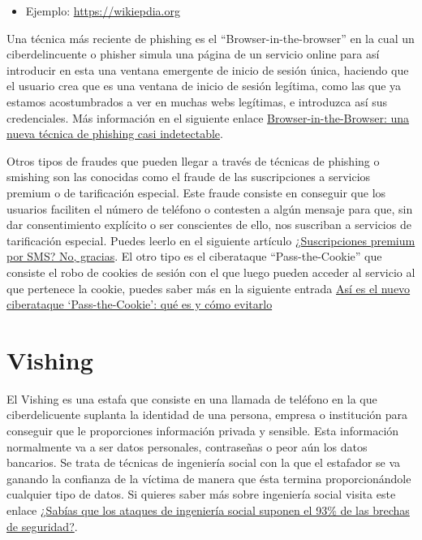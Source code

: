 \documentclass[
  a4paper,
  openany]{book}
\providecommand{\tightlist}{%
  \setlength{\itemsep}{0pt}\setlength{\parskip}{0pt}}
\begin{document}
\begin{itemize}
\tightlist
\item
  Ejemplo: \url{https://wikiepdia.org}
\end{itemize}

Una técnica más reciente de phishing es el ``Browser-in-the-browser'' en la cual un ciberdelincuente o phisher simula una página de un servicio online para así introducir en esta una ventana emergente de inicio de sesión única, haciendo que el usuario crea que es una ventana de inicio de sesión legítima, como las que ya estamos acostumbrados a ver en muchas webs legítimas, e introduzca así sus credenciales. Más información en el siguiente enlace \href{https://www.incibe.es/ciudadania/blog/browser-browser-una-nueva-tecnica-de-phishing-casi-indetectable}{Browser-in-the-Browser: una nueva técnica de phishing casi indetectable}.

Otros tipos de fraudes que pueden llegar a través de técnicas de phishing o smishing son las conocidas como el fraude de las suscripciones a servicios premium o de tarificación especial. Este fraude consiste en conseguir que los usuarios faciliten el número de teléfono o contesten a algún mensaje para que, sin dar consentimiento explícito o ser conscientes de ello, nos suscriban a servicios de tarificación especial. Puedes leerlo en el siguiente artículo \href{https://www.incibe.es/ciudadania/blog/suscripciones-premium-por-sms-no-gracias}{¿Suscripciones premium por SMS? No, gracias}. El otro tipo es el ciberataque ``Pass-the-Cookie'' que consiste el robo de cookies de sesión con el que luego pueden acceder al servicio al que pertenece la cookie, puedes saber más en la siguiente entrada \href{https://www.20minutos.es/tecnologia/ciberseguridad/ciberataque-pass-the-cookie-que-es-como-evitarlo-5163208/}{Así es el nuevo ciberataque `Pass-the-Cookie': qué es y cómo evitarlo}

\hypertarget{vishing}{%
\section{Vishing}\label{vishing}}

El Vishing es una estafa que consiste en una llamada de teléfono en la que ciberdelicuente suplanta la identidad de una persona, empresa o institución para conseguir que le proporciones información privada y sensible. Esta información normalmente va a ser datos personales, contraseñas o peor aún los datos bancarios. Se trata de técnicas de ingeniería social con la que el estafador se va ganando la confianza de la víctima de manera que ésta termina proporcionándole cualquier tipo de datos. Si quieres saber más sobre ingeniería social visita este enlace \href{https://www.osi.es/es/actualidad/blog/2019/12/04/sabias-que-los-ataques-de-ingenieria-social-suponen-el-93-de-las-brechas}{¿Sabías que los ataques de ingeniería social suponen el 93\% de las brechas de seguridad?}.
\end{document}
